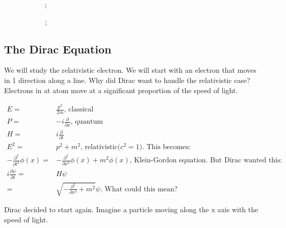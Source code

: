 \documentclass[]{article}
\begin{document}
\begin{figure}[H]
	\caption[Scatter electron and emit photon(field $A$):$A\Psi^+_e\Psi^-_e$]{Scatter electron and emit photon(field $A$):$A\Psi^+_e\Psi^-_e$. Sometimes what you thought was an electron behaves like an electron + photon. Low probability: think of as correction to electron, not a new process. If we look, we will screw up electron! Superposition.}
	\begin{center}
		\begin{subfigure}{0.45\textwidth}
		;
		\end{subfigure}
		\begin{subfigure}{0.45\textwidth}
			;
		\end{subfigure}
	\end{center}
\end{figure}

\subsection{The Dirac Equation}

We will study the relativistic electron. We will start with an electron that moves in 1 direction along a line. Why did Dirac want to handle the relativistic case? Electrons in at atom move at a significant proportion of the speed of light.  

\begin{align*}
E =& \frac{p^2}{2m} \text {, classical}\\
P =& -i \frac{\partial}{\partial x} \text{, quantum}\\
H = & i \frac{\partial}{\partial t}\\
E^2 =& p^2 + m^2 \text{, relativistic($c^2=1$). This becomes:}\\
-\frac{\partial^2}{\partial t^2} \phi(x) =& -\frac{\partial^2}{\partial x^2}\phi(x) + m^2 \phi(x) \text{, Klein-Gordon equation. But Dirac wanted this:}\\
i \frac{\partial \psi}{\partial t} =& H\psi\\
=& \sqrt{- \frac{\partial^2}{\partial x^2} + m^2} \psi \text{. What could this mean?}  
\end{align*}

Dirac decided to start again. Imagine a particle moving along the x axis with the speed of light.
\end{document}
